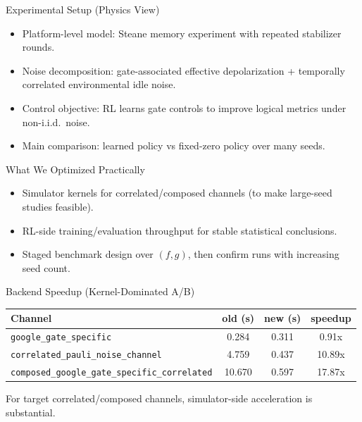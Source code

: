 \documentclass[10pt,aspectratio=169]{beamer}
\begin{document}
\begin{frame}{Experimental Setup (Physics View)}
  \begin{itemize}
    \item Platform-level model: Steane memory experiment with repeated stabilizer rounds.
    \item Noise decomposition: gate-associated effective depolarization + temporally correlated environmental idle noise.
    \item Control objective: RL learns gate controls to improve logical metrics under non-i.i.d.\ noise.
    \item Main comparison: learned policy vs fixed-zero policy over many seeds.
  \end{itemize}
\end{frame}

\begin{frame}{What We Optimized Practically}
  \begin{itemize}
    \item Simulator kernels for correlated/composed channels (to make large-seed studies feasible).
    \item RL-side training/evaluation throughput for stable statistical conclusions.
    \item Staged benchmark design over \((f,g)\), then confirm runs with increasing seed count.
  \end{itemize}
\end{frame}

\begin{frame}{Backend Speedup (Kernel-Dominated A/B)}
  \begin{table}
    \centering
    \small
    \begin{tabular}{lccc}
      \toprule
      Channel & old (s) & new (s) & speedup \\
      \midrule
      \texttt{google\_gate\_specific} & 0.284 & 0.311 & 0.91x \\
      \texttt{correlated\_pauli\_noise\_channel} & 4.759 & 0.437 & 10.89x \\
      \texttt{composed\_google\_gate\_specific\_correlated} & 10.670 & 0.597 & 17.87x \\
      \bottomrule
    \end{tabular}
  \end{table}
  \small
  For target correlated/composed channels, simulator-side acceleration is substantial.
\end{frame}
\end{document}

